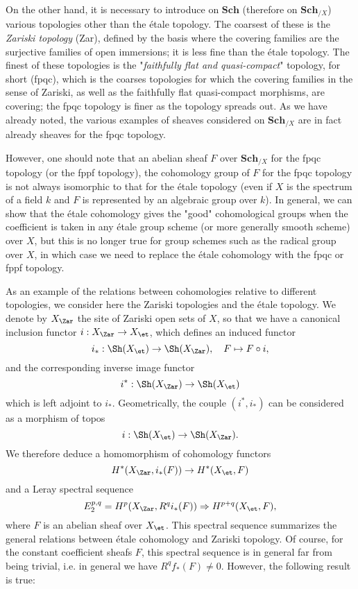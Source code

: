 On the other hand, it is necessary to introduce on $\mathbf{Sch}$ (therefore on $\mathbf{Sch}_{/X}$) various topologies other than the \'etale topology. The coarsest of these is the \textit{Zariski topology} (Zar), defined by the basis where the covering families are the surjective families of open immersions; it is less fine than the \'etale topology. The finest of these topologies is the "\textit{faithfully flat and quasi-compact}" topology, for short (fpqc), which is the coarses topologies for which the covering families in the sense of Zariski, as well as the faithfully flat quasi-compact morphisms, are covering; the fpqc topology is finer as the topology spreads out. As we have already noted, the various examples of sheaves considered on $\mathbf{Sch}_{/X}$ are in fact already sheaves for the fpqc topology.\par
However, one should note that an abelian sheaf $F$ over $\mathbf{Sch}_{/X}$ for the fpqc topology (or the fppf topology), the cohomology group of $F$ for the fpqc topology is not always isomorphic to that for the \'etale topology (even if $X$ is the spectrum of a field $k$ and $F$ is represented by an algebraic group over $k$). In general, we can show that the \'etale cohomology gives the "good" cohomological groups when the coefficient is taken in any \'etale group scheme (or more generally smooth scheme) over $X$, but this is no longer true for group schemes such as the radical group over $X$, in which case we need to replace the \'etale cohomology with the fpqc or fppf topology.\par
As an example of the relations between cohomologies relative to different topologies, we consider here the Zariski topologies and the \'etale topology. We denote by $X_{\Zar}$ the site of Zariski open sets of $X$, so that we have a canonical inclusion functor $i:X_\Zar\to X_\et$, which defines an induced functor
\[i_*:\Sh(X_\et)\to\Sh(X_\Zar),\quad F\mapsto F\circ i,\]
and the corresponding inverse image functor
\[i^*:\Sh(X_\Zar)\to\Sh(X_\et)\]
which is left adjoint to $i_*$. Geometrically, the couple $(i^*,i_*)$ can be considered as a morphism of topos
\[i:\Sh(X_\et)\to\Sh(X_\Zar).\]
We therefore deduce a homomorphism of cohomology functors
\[H^*(X_\Zar,i_*(F))\to H^*(X_\et,F)\]
and a Leray spectral sequence
\[E_2^{p,q}=H^p(X_\Zar,R^qi_*(F))\Rightarrow H^{p+q}(X_\et,F),\]
where $F$ is an abelian sheaf over $X_\et$. This spectral sequence summarizes the general relations between \'etale cohomology and Zariski topology. Of course, for the constant coefficient sheafs $F$, this spectral sequence is in general far from being trivial, i.e. in general we have $R^qf_*(F)\neq 0$. However, the following result is true:
